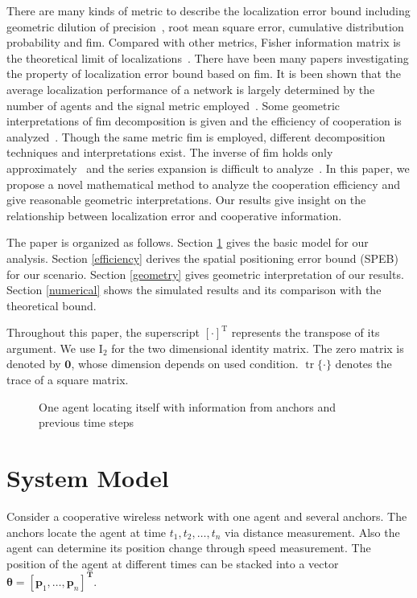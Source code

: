 \documentclass[conference]{IEEEtran}
\DeclareMathOperator\tr{tr}
\begin{document}
There are many kinds of metric to describe the localization error bound 
including geometric dilution of precision~\cite{6237577}, root mean square error, 
cumulative distribution probability and \ac{fim}. 
Compared with other metrics, Fisher information matrix is the theoretical limit of localizations~\cite{LimitBound2}. 
There have been many papers investigating the property of localization error bound based on \ac{fim}. 
It is been shown that the average localization performance of a network is largely determined by the number of agents and the signal metric employed~\cite{7887727}. 
Some geometric interpretations of \ac{fim} decomposition is given and the efficiency of cooperation is analyzed~\cite{7962761}. 
Though the same metric \ac{fim} is employed, different decomposition techniques and interpretations exist. 
The inverse of \ac{fim} holds only approximately~\cite{7887727} 
and the series expansion is difficult  to analyze~\cite{7962761}. In this paper, 
we propose a novel mathematical method to analyze the cooperation efficiency and give reasonable geometric interpretations. 
Our results give insight on the relationship between localization error and cooperative information. 

The paper is organized as follows. Section \ref{systemModel} gives the basic model for our analysis. 
Section \ref{efficiency} derives the spatial positioning error bound (SPEB) for our scenario. 
Section \ref{geometry} gives geometric interpretation of our results. 
Section \ref{numerical} shows the simulated results and its comparison with the theoretical bound.

Throughout this paper, the superscript $[\cdot]^{\mathrm{T}}$ represents the transpose of its argument. 
We use $\bm{\mathrm{I}}_2$ for the two dimensional identity matrix. The zero matrix is denoted by $\bm{0}$, 
whose dimension depends on used condition. $\tr\{\cdot\}$ 
denotes the trace of a square matrix.
\begin{figure}
  \centering
\def\svgwidth{7cm}

\caption{One agent locating itself with information from anchors and previous time steps}
\label{f1}
\end{figure}
\section{System Model}\label{systemModel}
Consider a cooperative wireless network with one agent and several anchors. The anchors locate the agent at time $t_1,t_2,\dots,t_n$ via distance measurement. Also the agent can determine its position change through speed measurement. The position of the agent at different times can be stacked into a vector $\bm{\theta}=[\bm{p}_1,\dots,\bm{p}_n]^{\mathbf{T}}$.
\end{document}
